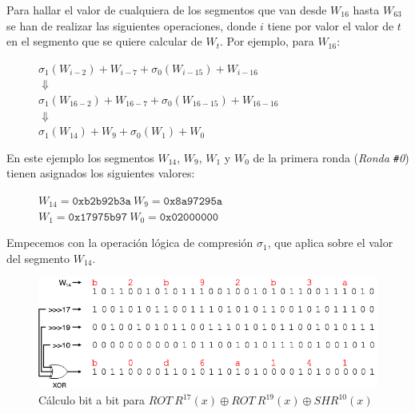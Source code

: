 \documentclass{article}
\begin{document}
    Para hallar el valor de cualquiera de los segmentos que van desde $W_{16}$ hasta $W_{63}$ se han de realizar las siguientes operaciones, donde $i$ tiene por valor el valor de $t$ en el segmento que se quiere calcular de $W_t$. Por ejemplo, para $W_{16}$:
    
    \begin{figure}[H]
    \centering
        $\sigma_{1}(W_{i-2})+W_{i-7}+\sigma_{0}(W_{i-15})+W_{i-16}$ \\
        $\Downarrow$ \\
        $\sigma_{1}(W_{16-2})+W_{16-7}+\sigma_{0}(W_{16-15})+W_{16-16}$ \\
        $\Downarrow$ \\
        $\sigma_{1}(W_{14})+W_{9}+\sigma_{0}(W_{1})+W_{0}$
    \end{figure}
    En este ejemplo los segmentos $W_{14}$, $W_{9}$, $W_{1}$ y $W_{0}$ de la primera ronda (\textit{Ronda \texttt{\#}0}) tienen asignados los siguientes valores:
    \begin{figure}[H]
    \centering
        $W_{14} = \texttt{0xb2b92b3a} \ W_{9} = \texttt{0x8a97295a}$ \\
        $W_{1} = \texttt{0x17975b97} \ W_{0} = \texttt{0x02000000}$
    \end{figure}
    
    Empecemos con la operación lógica de compresión $\sigma_{1}$, que aplica sobre el valor del segmento $W_{14}$.
    
    \begin{figure}[H]
    \centering
        \includegraphics[scale=0.41]{img/SHA-256-Wt_operacion_sigma1.png}
        \caption{Cálculo bit a bit para $ROT \ R^{17}(x) \oplus ROT \ R^{19}(x) \oplus SHR^{10}(x)$}
    \end{figure}
    
\end{document}
